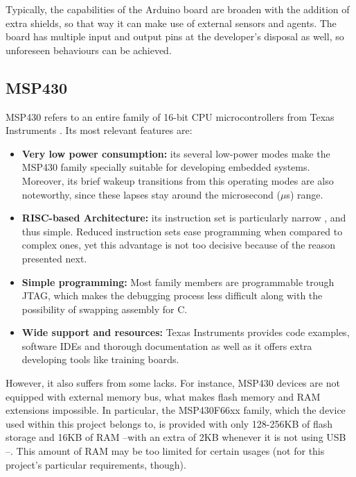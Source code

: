 			Typically, the capabilities of the Arduino board are broaden with the addition of extra shields,
			so that way it can make use of external sensors and agents. The board has multiple input and
			output pins at the developer's disposal as well, so unforeseen behaviours can be achieved.\\
			
		\subsection{MSP430}
		\label{ssec:msp430}
			MSP430 refers to an entire family of 16-bit CPU microcontrollers from Texas Instruments \cite{msp430}.
			Its most relevant features are:
			\begin{itemize}
				\item \textbf{Very low power consumption:} its several low-power modes make the MSP430 
					family specially suitable for developing embedded systems. Moreover, its brief wakeup 
					transitions from this operating modes are also noteworthy, since these lapses stay 
					around the microsecond ($\mu$s) range.
				\item \textbf{RISC-based Architecture:} its instruction set is particularly narrow \cite{msp430iss}, 
					and thus simple. Reduced instruction sets ease programming when compared to complex ones,
					yet this advantage is not too decisive because of the reason presented next.
				\item \textbf{Simple programming:} Most family members are programmable trough JTAG, which
					makes the debugging process less difficult along with the possibility of swapping
					assembly for C.
				\item \textbf{Wide support and resources:} Texas Instruments provides code examples, software 
					IDEs and thorough documentation as well as it offers extra developing tools like training 
					boards.
			\end{itemize}
			However, it also suffers from some lacks. For instance, MSP430 devices are not equipped with
			external memory bus, what makes flash memory and RAM extensions impossible. In particular, the
			MSP430F66xx family, which the device used within this project belongs to, is provided with only 
			128-256KB of flash storage and 16KB	of RAM --with an extra of 2KB whenever it is not using USB 
			\cite[p. 2]{msp430f6638ds}--. This amount of RAM may be too limited for certain usages (not for 
			this project's particular requirements, though).\\
			

